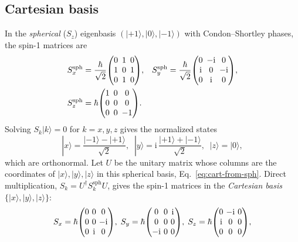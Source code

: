 \documentclass[twocolumn,aps,pra,floatfix,amsmath,amssymb,longbibliography]{revtex4-2}
\newcommand{\ii}{\mathrm{i}}
\begin{document}
\subsection{Cartesian basis}
In the \emph{spherical} ($S_z$) eigenbasis $(|{+1}\rangle,|0\rangle,|{-1}\rangle)$ with Condon--Shortley phases, the spin-1 matrices are~\cite{Sakurai-1994}
\begin{equation}
\setlength{\arraycolsep}{2.5pt}
\begin{aligned}
 S_x^{\mathrm{sph}}&=\frac{\hbar}{\sqrt{2}}\!\begin{pmatrix}0&1&0\\1&0&1\\0&1&0\end{pmatrix}\!,&
 S_y^{\mathrm{sph}}&=\frac{\hbar}{\sqrt{2}}\!\begin{pmatrix}0&-\ii&0\\\ii&0&-\ii\\0&\ii&0\end{pmatrix}\!,\\
 S_z^{\mathrm{sph}}&=\hbar\!\begin{pmatrix}1&0&0\\0&0&0\\0&0&-1\end{pmatrix}\!.
\end{aligned}
\label{eq:sph-matrices}
\end{equation}
Solving $S_k|k\rangle=0$ for $k=x,y,z$ gives the normalized states
\begin{equation}
 |x\rangle=\frac{|{-1}\rangle-|{+1}\rangle}{\sqrt2},\;\;
 |y\rangle=\ii\,\frac{|{+1}\rangle+|{-1}\rangle}{\sqrt2},\;\;
 |z\rangle=|0\rangle,
 \label{eq:cart-from-sph}
\end{equation}
which are orthonormal.  Let $U$ be the unitary matrix whose columns are the coordinates of $|x\rangle,|y\rangle,|z\rangle$ in this spherical basis, Eq.~\eqref{eq:cart-from-sph}.  Direct multiplication, $S_k=U^\dagger S_k^{\mathrm{sph}}U$, gives the spin-1 matrices in the \emph{Cartesian basis} $\{|x\rangle,|y\rangle,|z\rangle\}$:
\begin{equation}
\setlength{\arraycolsep}{1.8pt}
 S_x=\hbar\!\begin{pmatrix}0&0&0\\0&0&-\ii\\0&\ii&0\end{pmatrix}\!,\;
 S_y=\hbar\!\begin{pmatrix}0&0&\ii\\0&0&0\\-\ii&0&0\end{pmatrix}\!,\;
 S_z=\hbar\!\begin{pmatrix}0&-\ii&0\\\ii&0&0\\0&0&0\end{pmatrix}\!,
 \label{eq:cart-matrices}
\end{equation}
\end{document}
